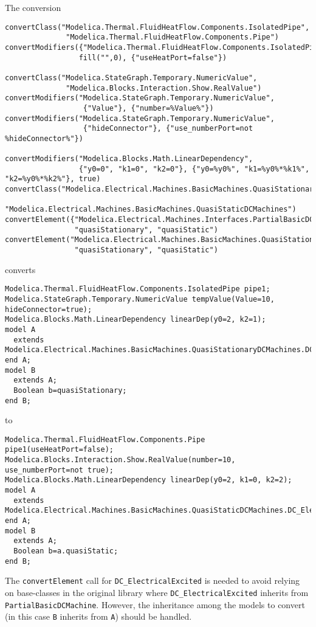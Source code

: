 \begin{example}
The conversion
\begin{lstlisting}[language=modelica]
convertClass("Modelica.Thermal.FluidHeatFlow.Components.IsolatedPipe",
              "Modelica.Thermal.FluidHeatFlow.Components.Pipe")
convertModifiers({"Modelica.Thermal.FluidHeatFlow.Components.IsolatedPipe"},
                 fill("",0), {"useHeatPort=false"})

convertClass("Modelica.StateGraph.Temporary.NumericValue",
              "Modelica.Blocks.Interaction.Show.RealValue")
convertModifiers("Modelica.StateGraph.Temporary.NumericValue",
                  {"Value"}, {"number=%Value%"})
convertModifiers("Modelica.StateGraph.Temporary.NumericValue",
                  {"hideConnector"}, {"use_numberPort=not %hideConnector%"})

convertModifiers("Modelica.Blocks.Math.LinearDependency",
                 {"y0=0", "k1=0", "k2=0"}, {"y0=%y0%", "k1=%y0%*%k1%", "k2=%y0%*%k2%"}, true)
convertClass("Modelica.Electrical.Machines.BasicMachines.QuasiStationaryDCMachines",
              "Modelica.Electrical.Machines.BasicMachines.QuasiStaticDCMachines")
convertElement({"Modelica.Electrical.Machines.Interfaces.PartialBasicDCMachine"},
                "quasiStationary", "quasiStatic")
convertElement("Modelica.Electrical.Machines.BasicMachines.QuasiStationaryDCMachines.DC_ElectricalExcited",
                "quasiStationary", "quasiStatic")
\end{lstlisting}
converts
\begin{lstlisting}[language=modelica]
Modelica.Thermal.FluidHeatFlow.Components.IsolatedPipe pipe1;
Modelica.StateGraph.Temporary.NumericValue tempValue(Value=10, hideConnector=true);
Modelica.Blocks.Math.LinearDependency linearDep(y0=2, k2=1);
model A
  extends Modelica.Electrical.Machines.BasicMachines.QuasiStationaryDCMachines.DC_ElectricalExcited;
end A;
model B
  extends A;
  Boolean b=quasiStationary;
end B;
\end{lstlisting}
to
\begin{lstlisting}[language=modelica]
Modelica.Thermal.FluidHeatFlow.Components.Pipe pipe1(useHeatPort=false);
Modelica.Blocks.Interaction.Show.RealValue(number=10, use_numberPort=not true);
Modelica.Blocks.Math.LinearDependency linearDep(y0=2, k1=0, k2=2);
model A
  extends Modelica.Electrical.Machines.BasicMachines.QuasiStaticDCMachines.DC_ElectricalExcited;
end A;
model B
  extends A;
  Boolean b=a.quasiStatic;
end B;
\end{lstlisting}
The \lstinline!convertElement! call for \lstinline!DC_ElectricalExcited! is needed to avoid relying on base-classes
in the original library where \lstinline!DC_ElectricalExcited! inherits from \lstinline!PartialBasicDCMachine!.
However, the inheritance among the models to convert (in this case \lstinline!B! inherits from \lstinline!A!) should be handled.
\end{example}

